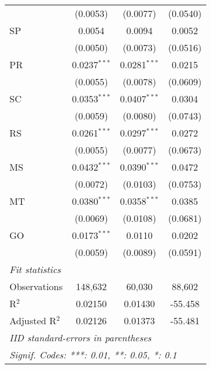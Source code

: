 \begin{tabular}{lccc}
                   & (0.0053)                & (0.0077)                & (0.0540)\\   
   SP              & 0.0054                  & 0.0094                  & 0.0052\\   
                   & (0.0050)                & (0.0073)                & (0.0516)\\   
   PR              & 0.0237$^{***}$          & 0.0281$^{***}$          & 0.0215\\   
                   & (0.0055)                & (0.0078)                & (0.0609)\\   
   SC              & 0.0353$^{***}$          & 0.0407$^{***}$          & 0.0304\\   
                   & (0.0059)                & (0.0080)                & (0.0743)\\   
   RS              & 0.0261$^{***}$          & 0.0297$^{***}$          & 0.0272\\   
                   & (0.0055)                & (0.0077)                & (0.0673)\\   
   MS              & 0.0432$^{***}$          & 0.0390$^{***}$          & 0.0472\\   
                   & (0.0072)                & (0.0103)                & (0.0753)\\   
   MT              & 0.0380$^{***}$          & 0.0358$^{***}$          & 0.0385\\   
                   & (0.0069)                & (0.0108)                & (0.0681)\\   
   GO              & 0.0173$^{***}$          & 0.0110                  & 0.0202\\   
                   & (0.0059)                & (0.0089)                & (0.0591)\\   
   \midrule
   \emph{Fit statistics}\\
   Observations    & 148,632                 & 60,030                  & 88,602\\  
   R$^2$           & 0.02150                 & 0.01430                 & -55.458\\  
   Adjusted R$^2$  & 0.02126                 & 0.01373                 & -55.481\\  
   \midrule \midrule
   \multicolumn{4}{l}{\emph{IID standard-errors in parentheses}}\\
   \multicolumn{4}{l}{\emph{Signif. Codes: ***: 0.01, **: 0.05, *: 0.1}}\\
\end{tabular}
\par\endgroup



